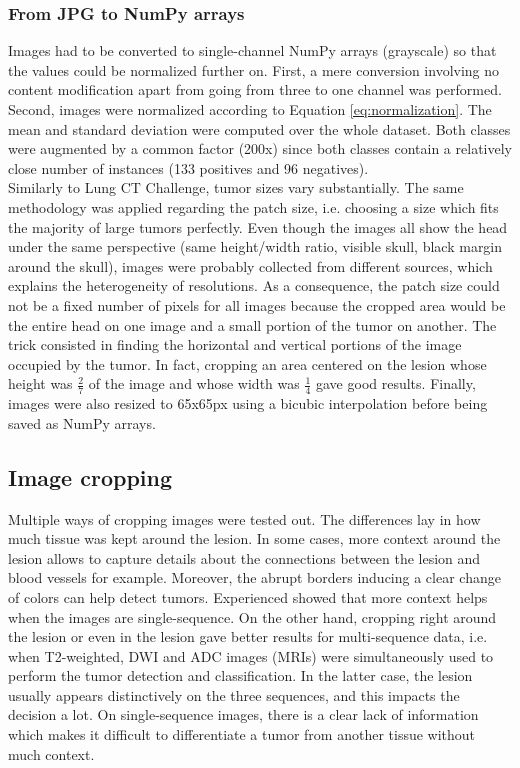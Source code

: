 \subsubsection{From JPG to NumPy arrays}
\setlength{\marginparwidth}{3cm}\leavevmode {}Images had to be converted to single-channel NumPy arrays (grayscale) so that the values could be normalized further on. First, a mere conversion involving no content modification apart from going from three to one channel was performed. Second, images were normalized according to Equation \ref{eq:normalization}. The mean and standard deviation were computed over the whole dataset. Both classes were augmented by a common factor (200x) since both classes contain a relatively close number of instances (133 positives and 96 negatives).\\
Similarly to Lung CT Challenge, tumor sizes vary substantially. The same methodology was applied regarding the patch size, i.e. choosing a size which fits the majority of large tumors perfectly. Even though the images all show the head under the same perspective (same height/width ratio, visible skull, black margin around the skull), images were probably collected from different sources, which explains the heterogeneity of resolutions. As a consequence, the patch size could not be a fixed number of pixels for all images because the cropped area would be the entire head on one image and a small portion of the tumor on another. The trick consisted in finding the horizontal and vertical portions of the image occupied by the tumor. In fact, cropping an area centered on the lesion whose height was $\frac{2}{7}$ of the image and whose width was $\frac{1}{4}$ gave good results. Finally, images were also resized to 65x65px using a bicubic interpolation before being saved as NumPy arrays. 


\subsection{Image cropping}
\setlength{\marginparwidth}{3cm}\leavevmode {}Multiple ways of cropping images were tested out. The differences lay in how much tissue was kept around the lesion. In some cases, more context around the lesion allows to capture details about the connections between the lesion and blood vessels for example. Moreover, the abrupt borders inducing a clear change of colors can help detect tumors. Experienced showed that more context helps when the images are single-sequence. On the other hand, cropping right around the lesion or even in the lesion gave better results for multi-sequence data, i.e. when T2-weighted, DWI and ADC images (MRIs) were simultaneously used to perform the tumor detection and classification. In the latter case, the lesion usually appears distinctively on the three sequences, and this impacts the decision a lot. On single-sequence images, there is a clear lack of information which makes it difficult to differentiate a tumor from another tissue without much context. 


